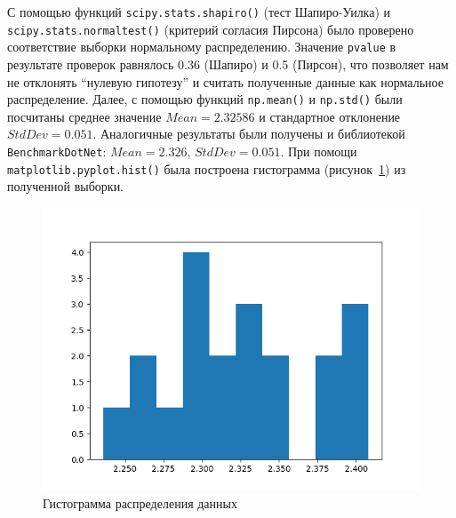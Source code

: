 \begin{table}[h]
\centering
    \caption{Замеры времени работы параллельной версии алгоритма на графе с 5000 вершинами плотности $0.9$. Для функции умножения выделено 4 потока, для функции сложения 2. Время измерено в секундах.}
    \label{data}
\end{table}

С помощью функций \texttt{scipy.stats.shapiro()} (тест Шапиро-Уилка) и \texttt{scipy.stats.normaltest()} (критерий согласия Пирсона) было проверено соответствие выборки нормальному распределению. Значение \texttt{pvalue} в результате проверок равнялось 0.36 (Шапиро) и 0.5 (Пирсон), что позволяет нам не отклонять \enquote{нулевую гипотезу} и считать полученные данные как нормальное распределение. Далее, с помощью функций \texttt{np.mean()} и \texttt{np.std()} были посчитаны среднее значение $Mean = 2.32586$ и стандартное отклонение $StdDev = 0.051$. Аналогичные результаты были получены и библиотекой \texttt{BenchmarkDotNet}: $Mean = 2.326$, $StdDev = 0.051$. При помощи \texttt{matplotlib.pyplot.hist()} была построена гистограмма (рисунок~\ref{fig:plot}) из полученной выборки.

\begin{figure}[H]
    \centering
    \includegraphics[width=\textwidth]{figures/plot.png}
    \caption{Гистограмма распределения данных}
    \label{fig:plot}
\end{figure}

